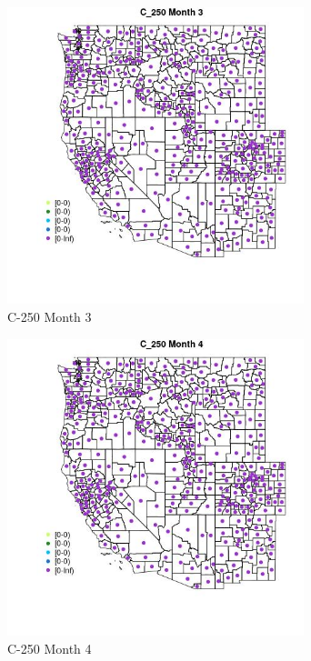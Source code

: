 \begin{figure} 
\centering  
\includegraphics[width=0.77\textwidth]{Code_Outputs/df_report_ML_predictors_CountyCentroid_Locations_Dates_2008-01-01to2018-12-31_MapObsMo3C_250.jpg} 
\caption{\label{fig:df_report_ML_predictors_CountyCentroid_Locations_Dates_2008-01-01to2018-12-31MapObsMo3C_250}C-250 Month 3} 
\end{figure} 
 

\clearpage 

\begin{figure} 
\centering  
\includegraphics[width=0.77\textwidth]{Code_Outputs/df_report_ML_predictors_CountyCentroid_Locations_Dates_2008-01-01to2018-12-31_MapObsMo4C_250.jpg} 
\caption{\label{fig:df_report_ML_predictors_CountyCentroid_Locations_Dates_2008-01-01to2018-12-31MapObsMo4C_250}C-250 Month 4} 
\end{figure} 
 

